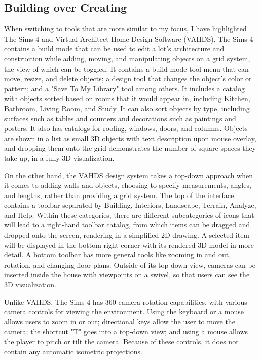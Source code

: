 \documentclass[10pt,twocolumn]{article}
\begin{document}
\subsection{Building over Creating}
When switching to tools that are more similar to my focus, I have highlighted The Sims 4 and Virtual Architect Home Design Software (VAHDS). The Sims 4 contains a build mode that can be used to edit a lot's architecture and construction while adding, moving, and manipulating objects on a grid system, the view of which can be toggled. It contains a build mode tool menu that can move, resize, and delete objects; a design tool that changes the object's color or pattern; and a "Save To My Library" tool among others. It includes a catalog with objects sorted based on rooms that it would appear in, including Kitchen, Bathroom, Living Room, and Study. It can also sort objects by type, including surfaces such as tables and counters and decorations such as paintings and posters. It also has catalogs for roofing, windows, doors, and columns. Objects are shown in a list as small 3D objects with text description upon mouse overlay, and dropping them onto the grid demonstrates the number of square spaces they take up, in a fully 3D visualization. 

On the other hand, the VAHDS design system takes a top-down approach when it comes to adding walls and objects, choosing to specify measurements, angles, and lengths, rather than providing a grid system. The top of the interface contains a toolbar separated by Building, Interiors, Landscape, Terrain, Analyze, and Help. Within these categories, there are different subcategories of icons that will lead to a right-hand toolbar catalog, from which items can be dragged and dropped onto the screen, rendering in a simplified 2D drawing. A selected item will be displayed in the bottom right corner with its rendered 3D model in more detail. A bottom toolbar has more general tools like zooming in and out, rotation, and changing floor plans. Outside of its top-down view, cameras can be inserted inside the house with viewpoints on a swivel, so that users can see the 3D visualization. 

Unlike VAHDS, The Sims 4 has 360 camera rotation capabilities, with various camera controls for viewing the environment. Using the keyboard or a mouse allows users to zoom in or out; directional keys allow the user to move the camera; the shortcut "T" goes into a top-down view; and using a mouse allows the player to pitch or tilt the camera. Because of these controls, it does not contain any automatic isometric projections.
\end{document}
